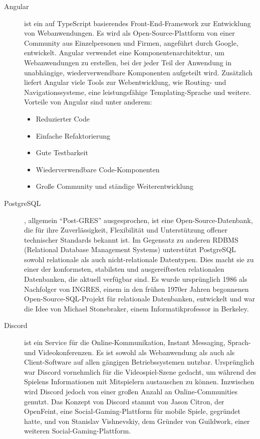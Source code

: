 \begin{description}
 \item[Angular] ist ein auf TypeScript basierendes Front-End-Framework zur Entwicklung von Webanwendungen. Es wird als Open-Source-Plattform von einer Community aus Einzelpersonen und Firmen, angeführt durch Google, entwickelt. Angular verwendet eine Komponentenarchitektur, um Webanwendungen zu erstellen, bei der jeder Teil der Anwendung in unabhängige, wiederverwendbare Komponenten aufgeteilt wird. Zusätzlich liefert Angular viele Tools zur Webentwicklung, wie Routing- und Navigationssysteme, eine leistungsfähige Templating-Sprache und weitere. Vorteile von Angular sind unter anderem:
 \begin{itemize}
     \item Reduzierter Code
     \item Einfache Refaktorierung
     \item Gute Testbarkeit
     \item Wiederverwendbare Code-Komponenten
     \item Große Community und ständige Weiterentwicklung
 \end{itemize}

 \item[PostgreSQL], allgemein \enquote{Post-GRES} ausgesprochen, ist eine Open-Source-Datenbank, die für ihre Zuverlässigkeit, Flexibilität und Unterstützung offener technischer Standards bekannt ist. Im Gegensatz zu anderen RDBMS (Relational Database Management Systems) unterstützt PostgreSQL sowohl relationale als auch nicht-relationale Datentypen. Dies macht sie zu einer der konformsten, stabilsten und ausgereiftesten relationalen Datenbanken, die aktuell verfügbar sind. Es wurde ursprünglich 1986 als Nachfolger von INGRES, einem in den frühen 1970er Jahren begonnenen Open-Source-SQL-Projekt für relationale Datenbanken, entwickelt und war die Idee von Michael Stonebraker, einem Informatikprofessor in Berkeley.

 \item[Discord] ist ein Service für die Online-Kommunikation, Instant Messaging, Sprach- und Videokonferenzen. Es ist sowohl als Webanwendung als auch als Client-Software auf allen gängigen Betriebssystemen nutzbar. Ursprünglich war Discord vornehmlich für die Videospiel-Szene gedacht, um während des Spielens Informationen mit Mitspielern austauschen zu können. Inzwischen wird Discord jedoch von einer großen Anzahl an Online-Communities genutzt. Das Konzept von Discord stammt von Jason Citron, der OpenFeint, eine Social-Gaming-Plattform für mobile Spiele, gegründet hatte, und von Stanislav Vishnevskiy, dem Gründer von Guildwork, einer weiteren Social-Gaming-Plattform.


\end{description}
